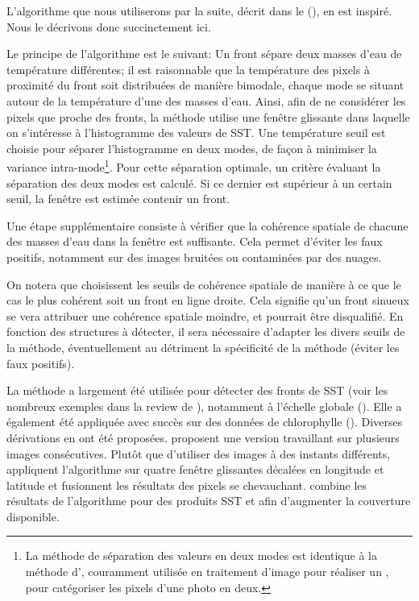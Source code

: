 \begin{technique}
L'algorithme que nous utiliserons par la suite, décrit dans le  (), en est inspiré. Nous le décrivons donc succinctement ici.

Le principe de l'algorithme  est le suivant: Un front sépare deux masses d'eau de température différentes; il est raisonnable que la température des pixels à proximité du front soit distribuées de manière bimodale, chaque mode se situant autour de la température d'une des masses d'eau.
Ainsi, afin de ne considérer les pixels que proche des fronts, la méthode utilise une fenêtre glissante dans laquelle on s'intéresse à l'histogramme des valeurs de SST.
Une température seuil est choisie pour séparer l'histogramme en deux modes, de façon à minimiser la variance intra-mode\footnote{%
  La méthode de séparation des valeurs en deux modes est identique à la méthode d'\textcite{otsu_1979}, couramment utilisée en traitement d'image pour réaliser un ,  pour catégoriser les pixels d'une photo en deux.
}.
Pour cette séparation optimale, un critère évaluant la séparation des deux modes est calculé. Si ce dernier est supérieur à un certain seuil, la fenêtre est estimée contenir un front.

Une étape supplémentaire consiste à vérifier que la cohérence spatiale de chacune des masses d'eau dans la fenêtre est suffisante.
Cela permet d'éviter les faux positifs, notamment sur des images bruitées ou contaminées par des nuages.

  On notera que \textcite{cayula_1992} choisissent les seuils de cohérence spatiale de manière à ce que le cas le plus cohérent soit un front en ligne droite.
  Cela signifie qu'un front sinueux se vera attribuer une cohérence spatiale moindre, et pourrait être disqualifié.
  En fonction des structures à détecter, il sera nécessaire d'adapter les divers seuils de la méthode, éventuellement au détriment la spécificité de la méthode (éviter les faux positifs).

\end{technique}

La méthode  a largement été utilisée pour détecter des fronts de SST (voir les nombreux exemples dans la review de \cite{belkin_2021}), notamment à l'échelle globale (\cite{belkin_2009a,belkin_2007}).
Elle a également été appliquée avec succès sur des données de chlorophylle (\cite{stegmann_2004,kahru_2012,bontempi_2004}).
Diverses dérivations en ont été proposées.
\textcite{cayula_1995} proposent une version travaillant sur plusieurs images consécutives.
Plutôt que d'utiliser des images à des instants différents, \textcite{nieto_2012} appliquent l'algorithme  sur quatre fenêtre glissantes décalées en longitude et latitude et fusionnent les résultats des pixels se chevauchant.
\textcite{miller_2009} combine les résultats de l'algorithme  pour des produits SST et  afin d'augmenter la couverture disponible.

